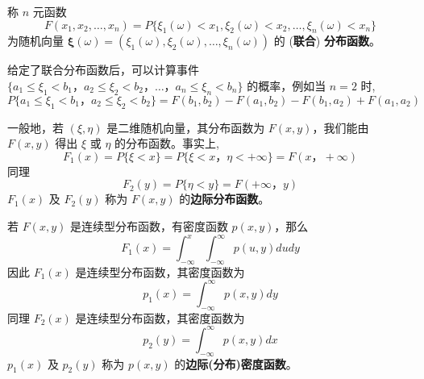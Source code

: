 \begin{definition}[联合分布函数] \label{def:joint_distribution_function}
称 $n$ 元函数
\begin{equation} \label{eq:joint_distribution_function_formula}
F(x_1,x_2,\ldots,x_n) = P\{\xi_1(\omega)<x_1,\xi_2(\omega)<x_2,\ldots,\xi_n(\omega)<x_n\}
\end{equation}
为随机向量 $\boldsymbol{\xi}(\omega) = (\xi_1(\omega),\xi_2(\omega),\ldots,\xi_n(\omega))$ 的 (\textbf{联合}) \textbf{分布函数}。
\end{definition}
\begin{remark}
    给定了联合分布函数后，可以计算事件 $\{a_1 \le \xi_1 < b_1，a_2 \le \xi_2 < b_2，\ldots，a_n \le \xi_n < b_n\}$ 的概率，例如当 $n=2$ 时,
\begin{equation} \label{eq:prob_for_n_2}
P\{a_1 \le \xi_1 < b_1，a_2 \le \xi_2 < b_2\} = F(b_1,b_2)-F(a_1,b_2)-F(b_1,a_2)+F(a_1,a_2)
\end{equation}
\end{remark}
\begin{definition}[边际分布函数]\label{def:边际分布}
    一般地，若 $(\xi,\eta)$ 是二维随机向量，其分布函数为 $F(x,y)$，我们能由 $F(x,y)$ 得出 $\xi$ 或 $\eta$ 的分布函数。事实上,
\begin{equation} \label{eq:marginal_cdf_xi}
F_1(x) = P\{\xi < x\} = P\{\xi < x，\eta < +\infty \} = F(x，+ \infty)
\end{equation}
同理
\[
F_2(y) = P\{\eta < y\} = F(+\infty，y)
\]
$F_1(x)$ 及 $F_2(y)$ 称为 $F(x,y)$ 的\textbf{边际分布函数}。
\end{definition}

\begin{definition}[边际密度函数]\label{def:边际密度函数}
    若 $F(x,y)$ 是连续型分布函数，有密度函数 $p(x,y)$，那么
\[
F_1(x) = \int_{-\infty}^x \int_{-\infty}^\infty p(u,y) dudy
\]
因此 $F_1(x)$ 是连续型分布函数，其密度函数为
\begin{equation} \label{eq:marginal_pdf_x}
p_1(x) = \int_{-\infty}^\infty p(x,y) dy
\end{equation}
同理 $F_2(x)$ 是连续型分布函数，其密度函数为
\begin{equation} \label{eq:marginal_pdf_y}
p_2(y) = \int_{-\infty}^\infty p(x,y) dx
\end{equation}
$p_1(x)$ 及 $p_2(y)$ 称为 $p(x,y)$ 的\textbf{边际(分布)密度函数}。
\end{definition}
